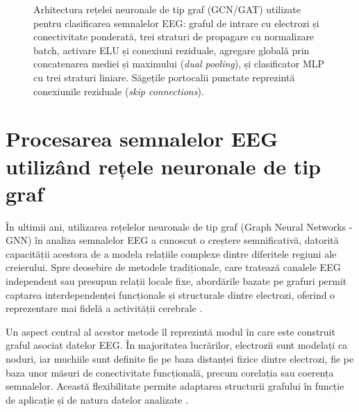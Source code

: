\documentclass[12pt,a4paper]{report}
\theoremstyle{definition}
\theoremstyle{remark}
\begin{document}
\begin{figure}[H]
\caption{Arhitectura rețelei neuronale de tip graf (GCN/GAT) utilizate pentru clasificarea
semnalelor EEG: graful de intrare cu electrozi și conectivitate ponderată, trei straturi de
propagare cu normalizare batch, activare ELU și conexiuni reziduale, agregare globală prin
concatenarea mediei și maximului (\textit{dual pooling}), și clasificator MLP cu trei straturi
liniare. Săgețile portocalii punctate reprezintă conexiunile reziduale (\textit{skip connections}).}
\label{fig:gnn_architecture}
\end{figure}

\section{Procesarea semnalelor EEG utilizând rețele neuronale de tip graf}

În ultimii ani, utilizarea rețelelor neuronale de tip graf (Graph Neural Networks - GNN) în analiza semnalelor EEG a cunoscut o creștere semnificativă, datorită capacității acestora de a modela relațiile complexe dintre diferitele regiuni ale creierului. Spre deosebire de metodele tradiționale, care tratează canalele EEG independent sau presupun relații locale fixe, abordările bazate pe grafuri permit captarea interdependenței funcționale și structurale dintre electrozi, oferind o reprezentare mai fidelă a activității cerebrale \cite{klepl2023gnn}.

Un aspect central al acestor metode îl reprezintă modul în care este construit graful asociat datelor EEG. În majoritatea lucrărilor, electrozii sunt modelați ca noduri, iar muchiile sunt definite fie pe baza distanței fizice dintre electrozi, fie pe baza unor măsuri de conectivitate funcțională, precum corelația sau coerența semnalelor. Această flexibilitate permite adaptarea structurii grafului în funcție de aplicație și de natura datelor analizate \cite{rahman2025advancement}.
\end{document}

